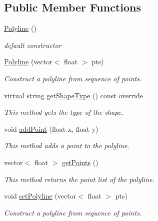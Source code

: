 \subsection*{Public Member Functions}
\begin{DoxyCompactItemize}
\item 
\hyperlink{classbridges_1_1datastructure_1_1_polyline_a488f6612485fc66534035c3574281a11}{Polyline} ()
\begin{DoxyCompactList}\small\item\em default constructor \end{DoxyCompactList}\item 
\hyperlink{classbridges_1_1datastructure_1_1_polyline_aceb69c3294ab4c16b2931e1073d3f996}{Polyline} (vector$<$ float $>$ pts)
\begin{DoxyCompactList}\small\item\em Construct a polyline from sequence of points. \end{DoxyCompactList}\item 
virtual string \hyperlink{classbridges_1_1datastructure_1_1_polyline_a5cd5cf2265353c90e91564121583aed1}{get\+Shape\+Type} () const override
\begin{DoxyCompactList}\small\item\em This method gets the type of the shape. \end{DoxyCompactList}\item 
void \hyperlink{classbridges_1_1datastructure_1_1_polyline_a00698223911f07cafca29ec80c507678}{add\+Point} (float x, float y)
\begin{DoxyCompactList}\small\item\em This method adds a point to the polyline. \end{DoxyCompactList}\item 
vector$<$ float $>$ \hyperlink{classbridges_1_1datastructure_1_1_polyline_a634034b6874af45e2b8c56d70e8725c5}{get\+Points} ()
\begin{DoxyCompactList}\small\item\em This method returns the point list of the polyline. \end{DoxyCompactList}\item 
void \hyperlink{classbridges_1_1datastructure_1_1_polyline_ab1fb850dabd3ed58fd4f916992a0b9a6}{set\+Polyline} (vector$<$ float $>$ pts)
\begin{DoxyCompactList}\small\item\em Construct a polyline from sequence of points. \end{DoxyCompactList}\item 

\end{DoxyCompactItemize}
